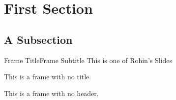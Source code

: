 \section{First Section}

\subsection{A Subsection}
	\begin{frame}{Frame Title}{Frame Subtitle}
		This is one of Rohin's Slides
	\end{frame}
    

    \begin{frame}{\null}
        This is a frame with no title.
    \end{frame}

    \begin{frame}
        This is a frame with no header.
    \end{frame}